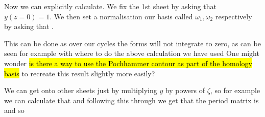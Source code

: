 \documentclass{article}
\begin{document}
Now we can explicitly calculate. We fix the 1st sheet by asking that $y(z=0)=1$. We then set a normalisation our basis called $\omega_1, \omega_2$ respectively by asking that .
\begin{remark}
	This can be done as over our cycles the forms will not integrate to zero, as can be seen for example with 
	where to do the above calculation we have used 
	One might wonder \hl{is there a way to use the Pochhammer contour as part of the homology basis} to recreate this result slightly more easily? 
\end{remark}
We can get onto other sheets just by multiplying $y$ by powers of $\zeta$, so for example we can calculate that 
and following this through we get that the period matrix is 
and so 
\end{document}
